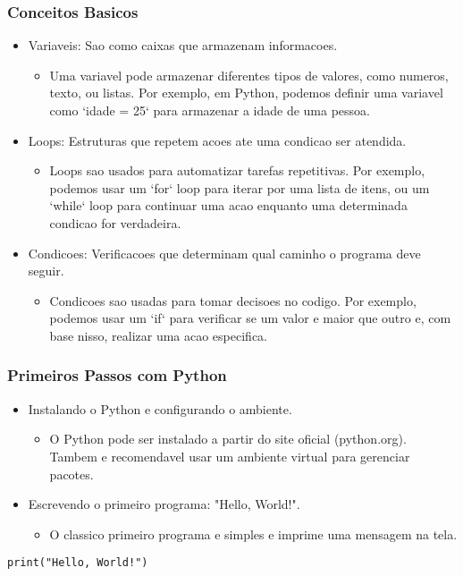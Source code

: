 \documentclass{beamer}
\begin{document}
\begin{frame}
  \frametitle{Conceitos Basicos}
  \begin{itemize}
    \item Variaveis: Sao como caixas que armazenam informacoes.
      \begin{itemize}
        \item Uma variavel pode armazenar diferentes tipos de valores, como numeros, texto, ou listas. Por exemplo, em Python, podemos definir uma variavel como `idade = 25` para armazenar a idade de uma pessoa.
      \end{itemize}
    \item Loops: Estruturas que repetem acoes ate uma condicao ser atendida.
      \begin{itemize}
        \item Loops sao usados para automatizar tarefas repetitivas. Por exemplo, podemos usar um `for` loop para iterar por uma lista de itens, ou um `while` loop para continuar uma acao enquanto uma determinada condicao for verdadeira.
      \end{itemize}
    \item Condicoes: Verificacoes que determinam qual caminho o programa deve seguir.
      \begin{itemize}
        \item Condicoes sao usadas para tomar decisoes no codigo. Por exemplo, podemos usar um `if` para verificar se um valor e maior que outro e, com base nisso, realizar uma acao especifica.
      \end{itemize}
  \end{itemize}
\end{frame}

\begin{frame}[fragile]
  \frametitle{Primeiros Passos com Python}
  \begin{itemize}
    \item Instalando o Python e configurando o ambiente.
      \begin{itemize}
        \item O Python pode ser instalado a partir do site oficial (python.org). Tambem e recomendavel usar um ambiente virtual para gerenciar pacotes.
      \end{itemize}
    \item Escrevendo o primeiro programa: "Hello, World!".
      \begin{itemize}
        \item O classico primeiro programa e simples e imprime uma mensagem na tela.
      \end{itemize}
  \end{itemize}
  \tiny
\begin{verbatim}
print("Hello, World!")
\end{verbatim}
\end{frame}
\end{document}
